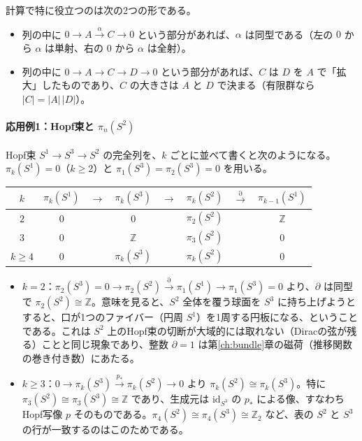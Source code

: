 \documentclass[uplatex, dvipdfmx, book]{jsbook}
\begin{document}
計算で特に役立つのは次の2つの形である。
\begin{itemize}
    \item 列の中に $0 \to A \xrightarrow{\ \alpha\ } C \to 0$ という部分があれば、$\alpha$ は同型である（左の $0$ から $\alpha$ は単射、右の $0$ から $\alpha$ は全射）。
    \item 列の中に $0 \to A \to C \to D \to 0$ という部分があれば、$C$ は $D$ を $A$ で「拡大」したものであり、$C$ の大きさは $A$ と $D$ で決まる（有限群なら $|C| = |A|\,|D|$）。
\end{itemize}

\paragraph{応用例1：Hopf束と $\pi_n(S^2)$}
Hopf束 $S^1 \to S^3 \to S^2$ の完全列を、$k$ ごとに並べて書くと次のようになる。$\pi_k(S^1) = 0$（$k \ge 2$）と $\pi_1(S^3) = \pi_2(S^3) = 0$ を用いる。
\begin{center}
\begin{tabular}{c|ccccccc}
    \hline
    $k$ & $\pi_k(S^1)$ & $\to$ & $\pi_k(S^3)$ & $\to$ & $\pi_k(S^2)$ & $\xrightarrow{\partial}$ & $\pi_{k-1}(S^1)$ \\
    \hline
    $2$ & $0$ & & $0$ & & $\pi_2(S^2)$ & & $\mathbb{Z}$ \\
    $3$ & $0$ & & $\mathbb{Z}$ & & $\pi_3(S^2)$ & & $0$ \\
    $k \ge 4$ & $0$ & & $\pi_k(S^3)$ & & $\pi_k(S^2)$ & & $0$ \\
    \hline
\end{tabular}
\end{center}
\begin{itemize}
    \item $k = 2$：$\pi_2(S^3) = 0 \to \pi_2(S^2) \xrightarrow{\partial} \pi_1(S^1) \to \pi_1(S^3) = 0$ より、$\partial$ は同型で $\pi_2(S^2) \cong \mathbb{Z}$。意味を見ると、$S^2$ 全体を覆う球面を $S^3$ に持ち上げようとすると、口が1つのファイバー（円周 $S^1$）を1周する円板になる、ということである。これは $S^2$ 上のHopf束の切断が大域的には取れない（Diracの弦が残る）ことと同じ現象であり、整数 $\partial = 1$ は第\ref{ch:bundle}章の磁荷（推移関数の巻き付き数）にあたる。
    \item $k \ge 3$：$0 \to \pi_k(S^3) \xrightarrow{p_*} \pi_k(S^2) \to 0$ より $\pi_k(S^2) \cong \pi_k(S^3)$。特に $\pi_3(S^2) \cong \pi_3(S^3) \cong \mathbb{Z}$ であり、生成元は $\mathrm{id}_{S^3}$ の $p_*$ による像、すなわちHopf写像 $p$ そのものである。$\pi_4(S^2) \cong \pi_4(S^3) \cong \mathbb{Z}_2$ など、表の $S^2$ と $S^3$ の行が一致するのはこのためである。
\end{itemize}
\end{document}
